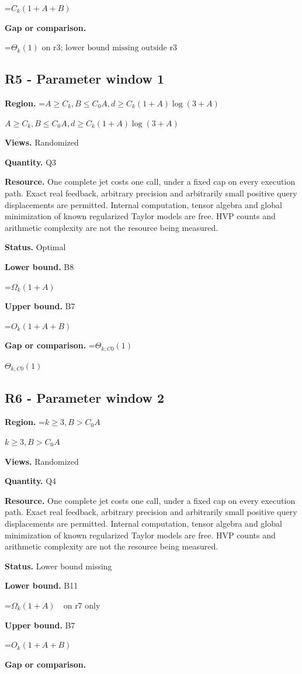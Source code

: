 \documentclass[10pt,a4paper]{article}
\newcommand{\AtlasMath}[1]{\par\begingroup\centering\setbox0=\hbox{$\displaystyle #1$}\ifdim\wd0>1.4\linewidth\typeout{ATLAS WIDE FORMULA: \the\wd0}\fi\ifdim\wd0>\linewidth\resizebox{\linewidth}{!}{\box0}\else\box0\fi\par\endgroup}
\newcommand{\AtlasInlineMath}[1]{\begingroup\setbox0=\hbox{$#1$}\ifdim\wd0>.4\linewidth\endgroup\AtlasMath{#1}\else\endgroup$#1$\fi}
\begin{document}
\AtlasMath{C_k(1+A+B)}
\textbf{Gap or comparison.}

\AtlasMath{\Theta_k(1)\text{ on r3; lower bound missing outside r3}}
\subsection{R5 - Parameter window 1}
\textbf{Region.} \AtlasInlineMath{A\ge C_k,B\le C_0 A,d\ge C_k(1+A)\log(3+A)}

\textbf{Views.} Randomized

\textbf{Quantity.} Q3

\textbf{Resource.} One complete jet costs one call, under a fixed cap on every execution path. Exact real feedback, arbitrary precision and arbitrarily small positive query displacements are permitted. Internal computation, tensor algebra and global minimization of known regularized Taylor models are free. HVP counts and arithmetic complexity are not the resource being measured.

\textbf{Status.} Optimal

\textbf{Lower bound.} B8

\AtlasMath{\Omega_k(1+A)}
\textbf{Upper bound.} B7

\AtlasMath{O_k(1+A+B)}
\textbf{Gap or comparison.} \AtlasInlineMath{\Theta_{k,C0}(1)}

\subsection{R6 - Parameter window 2}
\textbf{Region.} \AtlasInlineMath{k\ge 3,B>C_0 A}

\textbf{Views.} Randomized

\textbf{Quantity.} Q4

\textbf{Resource.} One complete jet costs one call, under a fixed cap on every execution path. Exact real feedback, arbitrary precision and arbitrarily small positive query displacements are permitted. Internal computation, tensor algebra and global minimization of known regularized Taylor models are free. HVP counts and arithmetic complexity are not the resource being measured.

\textbf{Status.} Lower bound missing

\textbf{Lower bound.} B11

\AtlasMath{\Omega_k(1+A)\quad\text{on r7 only}}
\textbf{Upper bound.} B7

\AtlasMath{O_k(1+A+B)}
\textbf{Gap or comparison.}
\end{document}
